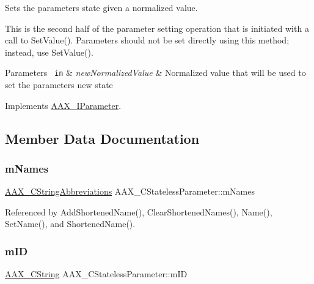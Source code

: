Sets the parameter\textquotesingle{}s state given a normalized value. 

This is the second half of the parameter setting operation that is initiated with a call to Set\+Value(). Parameters should not be set directly using this method; instead, use Set\+Value().


\begin{DoxyParams}[1]{Parameters}
\mbox{\texttt{ in}}  & {\em new\+Normalized\+Value} & Normalized value that will be used to set the parameter\textquotesingle{}s new state \\
\hline
\end{DoxyParams}


Implements \mbox{\hyperlink{a01857_a408918950ea63aa0e85b90e588856624}{A\+A\+X\+\_\+\+I\+Parameter}}.



\subsection{Member Data Documentation}
\mbox{\label{a01541_a435122fdc399b8733d2d6a0a5d03ede0}} 
\subsubsection{\texorpdfstring{mNames}{mNames}}
{\footnotesize\ttfamily \mbox{\hyperlink{a01577}{A\+A\+X\+\_\+\+C\+String\+Abbreviations}} A\+A\+X\+\_\+\+C\+Stateless\+Parameter\+::m\+Names\hspace{0.3cm}{\ttfamily [protected]}}



Referenced by Add\+Shortened\+Name(), Clear\+Shortened\+Names(), Name(), Set\+Name(), and Shortened\+Name().

\mbox{\label{a01541_a9fe3a08c63ad9f1993bb0eeddb1a3bcc}} 
\subsubsection{\texorpdfstring{mID}{mID}}
{\footnotesize\ttfamily \mbox{\hyperlink{a01573}{A\+A\+X\+\_\+\+C\+String}} A\+A\+X\+\_\+\+C\+Stateless\+Parameter\+::m\+ID\hspace{0.3cm}{\ttfamily [protected]}}



